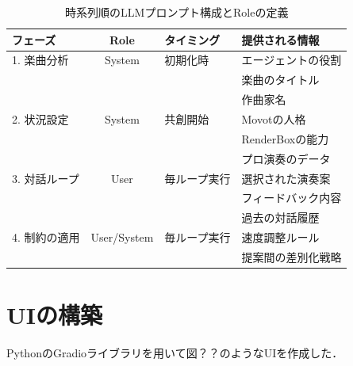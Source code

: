 \begin{table}[htbp]
\centering
\caption{時系列順のLLMプロンプト構成とRoleの定義}
\label{tab:prompt_flow}
\begin{tabularx}{\textwidth}{l c l l} 
\hline
\textbf{フェーズ} & \textbf{Role} & \textbf{タイミング} & \textbf{提供される情報} \\ \hline
1. 楽曲分析 & System & 初期化時 & エージェントの役割 \\
 & & & 楽曲のタイトル \\
 & & & 作曲家名 \\ \hline
2. 状況設定 & System & 共創開始 & Movotの人格 \\
 & & & RenderBoxの能力 \\
 & & & プロ演奏のデータ \\ \hline
3. 対話ループ & User & 毎ループ実行 & 選択された演奏案 \\
 & & & フィードバック内容 \\
 & & & 過去の対話履歴 \\ \hline
4. 制約の適用 & User/System & 毎ループ実行 & 速度調整ルール \\
 & & & 提案間の差別化戦略 \\ \hline
\end{tabularx}
\end{table}



\section{UIの構築}
\label{sec:UIの構築}
PythonのGradioライブラリを用いて図？？のようなUIを作成した．